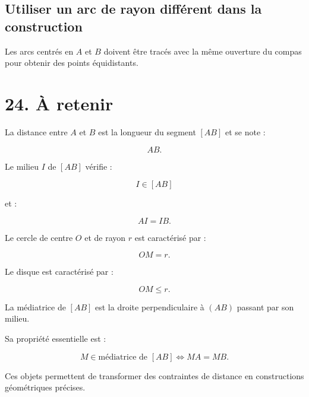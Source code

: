 \subsection{Utiliser un arc de rayon différent dans la construction}

Les arcs centrés en $A$ et $B$ doivent être tracés avec la même ouverture du compas pour obtenir des points équidistants.

\section{24. À retenir}

La distance entre $A$ et $B$ est la longueur du segment $[AB]$ et se note :

\[
AB.
\]

Le milieu $I$ de $[AB]$ vérifie :

\[
I\in[AB]
\]

et :

\[
AI=IB.
\]

Le cercle de centre $O$ et de rayon $r$ est caractérisé par :

\[
\boxed{OM=r}.
\]

Le disque est caractérisé par :

\[
\boxed{OM\le r}.
\]

La médiatrice de $[AB]$ est la droite perpendiculaire à $(AB)$ passant par son milieu.

Sa propriété essentielle est :

\[
\boxed{
M\in\text{médiatrice de }[AB]
\iff
MA=MB
}.
\]

Ces objets permettent de transformer des contraintes de distance en constructions géométriques précises.

